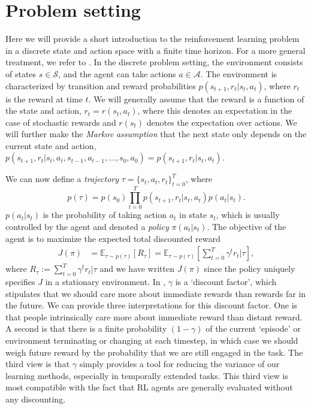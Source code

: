 \section{Problem setting}
\label{sec:problem_setting}

Here we will provide a short introduction to the reinforcement learning problem in a discrete state and action space with a finite time horizon.
For a more general treatment, we refer to \citet{sutton2018reinforcement}.
In the discrete problem setting, the environment consists of states $s \in \mathcal{S}$, and the agent can take actions $a \in \mathcal{A}$.
The environment is characterized by transition and reward probabilities $p(s_{t+1}, r_t | s_t, a_t)$, where $r_t$ is the reward at time $t$.
We will generally assume that the reward is a function of the state and action, $r_t = r(s_t, a_t)$, where this denotes an expectation in the case of stochastic rewards and $r(s_t)$ denotes the expectation over actions.
We will further make the \emph{Markov assumption} that the next state only depends on the current state and action, $p(s_{t+1}, r_t | s_t, a_t, s_{t-1}, a_{t-1}, ..., s_0, a_0) = p(s_{t+1}, r_t | s_t, a_t)$.

We can now define a \emph{trajectory} $\tau = \{ s_t, a_t, r_t \}_{t = 0}^T$, where
\begin{equation}
    p(\tau) = p(s_0) \prod_{t = 0}^T p(s_{t+1}, r_t | s_t, a_t) p(a_t|s_t).
\end{equation}
$p(a_t|s_t)$ is the probability of taking action $a_t$ in state $s_t$, which is usually controlled by the agent and denoted a \emph{policy} $\pi(a_t|s_t)$.
The objective of the agent is to maximize the expected total discounted reward
\begin{align}
    \label{eq:RL_objective}
    J(\pi) &= \mathbb{E}_{\tau \sim p(\tau)} \left [ R_\tau \right ] = \mathbb{E}_{\tau \sim p(\tau)} \left [ \sum_{t=0}^T \gamma^t r_t | \tau \right ],
\end{align}
where $R_\tau := \sum_{t=0}^T \gamma^t r_t | \tau$ and we have written $J(\pi)$ since the policy uniquely specifies $J$ in a stationary environment.
In , $\gamma$ is a `discount factor', which stipulates that we should care more about immediate rewards than rewards far in the future.
We can provide three interpretations for this discount factor.
One is that people intrinsically care more about immediate reward than distant reward.
A second is that there is a finite probability $(1-\gamma)$ of the current `episode' or environment terminating or changing at each timestep, in which case we should weigh future reward by the probability that we are still engaged in the task.
The third view is that $\gamma$ simply provides a tool for reducing the variance of our learning methods, especially in temporally extended tasks.
This third view is most compatible with the fact that RL agents are generally evaluated without any discounting.

